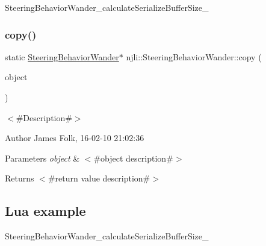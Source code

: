 \begin{DoxyCodeInclude}
\end{DoxyCodeInclude}
Steering\+Behavior\+Wander\+\_\+calculate\+Serialize\+Buffer\+Size\+\_\+ \mbox{\label{classnjli_1_1_steering_behavior_wander_a2ef150a85308d6b6ad785ab7295785c9}} 
\subsubsection{\texorpdfstring{copy()}{copy()}}
{\footnotesize\ttfamily static \mbox{\hyperlink{classnjli_1_1_steering_behavior_wander}{Steering\+Behavior\+Wander}}$\ast$ njli\+::\+Steering\+Behavior\+Wander\+::copy (\begin{DoxyParamCaption}\item[{const \mbox{\hyperlink{classnjli_1_1_steering_behavior_wander}{Steering\+Behavior\+Wander}} \&}]{object }\end{DoxyParamCaption})\hspace{0.3cm}{\ttfamily [static]}}



$<$\#\+Description\#$>$ 

\begin{DoxyAuthor}{Author}
James Folk, 16-\/02-\/10 21\+:02\+:36
\end{DoxyAuthor}

\begin{DoxyParams}{Parameters}
{\em object} & $<$\#object description\#$>$\\
\hline
\end{DoxyParams}
\begin{DoxyReturn}{Returns}
$<$\#return value description\#$>$
\end{DoxyReturn}
\hypertarget{classnjli_1_1_steering_behavior_wander_ex1}{}\subsection{Lua example}\label{classnjli_1_1_steering_behavior_wander_ex1}

\begin{DoxyCodeInclude}
\end{DoxyCodeInclude}
Steering\+Behavior\+Wander\+\_\+calculate\+Serialize\+Buffer\+Size\+\_\+ \mbox{\label{classnjli_1_1_steering_behavior_wander_a57dab62e80c4236d2fba9a6cab78ae7f}} 
